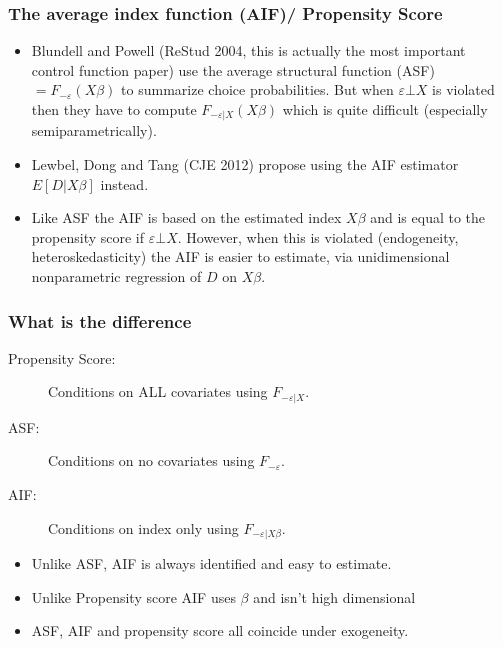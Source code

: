 \begin{frame}
\frametitle{ The average index function (AIF)/ Propensity Score}
\begin{itemize}
\item Blundell and Powell (ReStud 2004, this is actually the most important control function paper) use the average structural function (ASF) $= F_{-\varepsilon} (X \beta) $ to summarize choice probabilities. But when $\varepsilon \bot X$ is violated then they have to compute $F_{-\varepsilon | X} (X \beta) $ which is quite difficult (especially semiparametrically).
\item Lewbel, Dong and Tang (CJE 2012) propose using the AIF estimator $E[D | X \beta]$ instead.
\item Like ASF the AIF is based on the estimated index $X \beta$ and is equal to the propensity score if $\varepsilon \bot X$. However, when this is violated (endogeneity, heteroskedasticity) the AIF is easier to estimate, via unidimensional nonparametric regression of $D$ on $X \beta$.
\end{itemize}
\end{frame}

\begin{frame}
\frametitle{ What is the difference}
\begin{description}
\item[Propensity Score: ]  Conditions on ALL covariates using $F_{-\varepsilon | X}$.
\item[ASF: ]  Conditions on no covariates using $F_{-\varepsilon }$.
\item[AIF: ]  Conditions on index only  using $F_{-\varepsilon | X \beta}$.
\end{description} 

\begin{itemize}
\item Unlike ASF, AIF is always identified and easy to estimate.
\item Unlike Propensity score AIF uses $\beta$ and isn't high dimensional
\item ASF, AIF and propensity score all coincide under exogeneity.
\end{itemize}
\end{frame}


